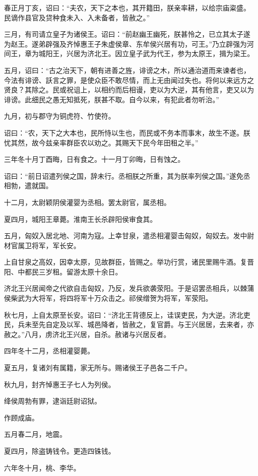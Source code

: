 \documentclass[]{article}
\begin{document}
春正月丁亥，诏曰：``夫农，天下之本也，其开籍田，朕亲率耕，以给宗庙粢盛。民谪作县官及贷种食未入、入未备者，皆赦之。''

三月，有司请立皇子为诸侯王。诏曰：``前赵幽王幽死，朕甚怜之，已立其太子遂为赵王。遂弟辟强及齐悼惠王子朱虚侯章、东牟侯兴居有功，可王。''乃立辟强为河间王，章为城阳王，兴居为济北王。因立皇子武为代王，参为太原王，揖为梁王。

五月，诏曰：``古之治天下，朝有进善之旌，诽谤之木，所以通治道而来谏者也，今法有诽谤、訞言之罪，是使众臣不敢尽情，而上无由闻过失也。将何以来远方之贤良？其除之。民或祝诅上，以相约而后相谩，吏以为大逆，其有他言，吏又以为诽谤。此细民之愚无知抵死，朕甚不取。自今以来，有犯此者勿听治。''

九月，初与郡守为铜虎符、竹使符。

诏曰：``农，天下之大本也，民所恃以生也，而民或不务本而事末，故生不遂。朕忧其然，故今兹亲率群臣农以劝之。其赐天下民今年田租之半。''

三年冬十月丁酉晦，日有食之。十一月丁卯晦，日有蚀之。

诏曰：``前日诏遣列侯之国，辞未行。丞相朕之所重，其为朕率列侯之国。''遂免丞相勃，遣就国。

十二月，太尉颖阴侯灌婴为丞相。罢太尉官，属丞相。

夏四月，城阳王章薨。淮南王长杀辟阳侯审食其。

五月，匈奴入居北地、河南为寇。上幸甘泉，遣丞相灌婴击匈奴，匈奴去。发中尉材官属卫将军，军长安。

上自甘泉之高奴，因幸太原，见故群臣，皆赐之。举功行赏，诸民里赐牛酒。复晋阳、中都民三岁租。留游太原十余日。

济北王兴居闻帝之代欲自击匈奴，乃反，发兵欲袭荥阳。于是诏罢丞相兵，以棘蒲侯柴武为大将军，将四将军十万众击之。祁侯缯贺为将军，军荥阳。

秋七月，上自太原至长安。诏曰：``济北王背德反上，诖误吏民，为大逆。济北吏民，兵未至先自定及以军、城邑降者，皆赦之，复官爵。与王兴居居，去来者，亦赦之。''八月，虏济北王兴居，自杀。赦诸与兴居反者。

四年冬十二月，丞相灌婴薨。

夏五月，复诸刘有属籍，家无所与。赐诸侯王子邑各二千户。

秋九月，封齐悼惠王子七人为列侯。

绛侯周勃有罪，逮诣廷尉诏狱。

作顾成庙。

五月春二月，地震。

夏四月，除盗铸钱令。更造四铢钱。

六年冬十月，桃、李华。
\end{document}
